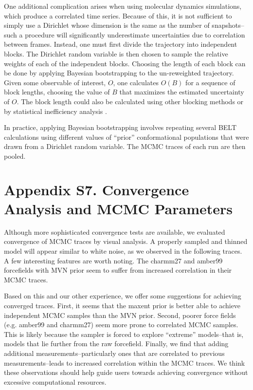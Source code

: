 \documentclass[journal=jacsat,manuscript=article]{achemso}
\begin{document}
One additional complication arises when using molecular dynamics simulations, which produce a correlated time series.  Because of this, it is not sufficient to simply use a Dirichlet whose dimension is the same as the number of snapshots--such a procedure will significantly underestimate uncertainties due to correlation between frames.  Instead, one must first divide the trajectory into independent blocks.  The Dirichlet random variable is then chosen to sample the relative weights of each of the independent blocks.  Choosing the length of each block can be done by applying Bayesian bootstrapping to the un-reweighted trajectory.  Given some observable of interest, $O$, one calculates $O(B)$ for a sequence of block lengths, choosing the value of $B$ that maximizes the estimated uncertainty of $O$.  The block length could also be calculated using other blocking methods \cite{flyvbjerg1989error} or by statistical inefficiency analysis \cite{shirts2008}.  

In practice, applying Bayesian bootstrapping involves repeating several BELT calculations using different values of ``prior'' conformational populations that were drawn from a Dirichlet random variable.  The MCMC traces of each run are then pooled.  

\newpage

\section{Appendix S7.  Convergence Analysis and MCMC Parameters}

Although more sophisticated convergence tests are available, we evaluated convergence of MCMC traces by visual analysis.  A properly sampled and thinned model will appear similar to white noise, as we observed in the following traces.  A few interesting features are worth noting.  The charmm27 and amber99 forcefields with MVN prior seem to suffer from increased correlation in their MCMC traces.  

Based on this and our other experience, we offer some suggestions for achieving converged traces.  First, it seems that the maxent prior is better able to achieve independent MCMC samples than the MVN prior.  Second, poorer force fields (e.g. amber99 and charmm27) seem more prone to correlated MCMC samples.  This is likely because the sampler is forced to explore ``extreme'' models--that is, models that lie further from the raw forcefield.  Finally, we find that adding additional measurements--particularly ones that are correlated to previous measurements--leads to increased correlation within the MCMC traces.  We think these observations should help guide users towards achieving convergence without excessive computational resources.  
\end{document}
